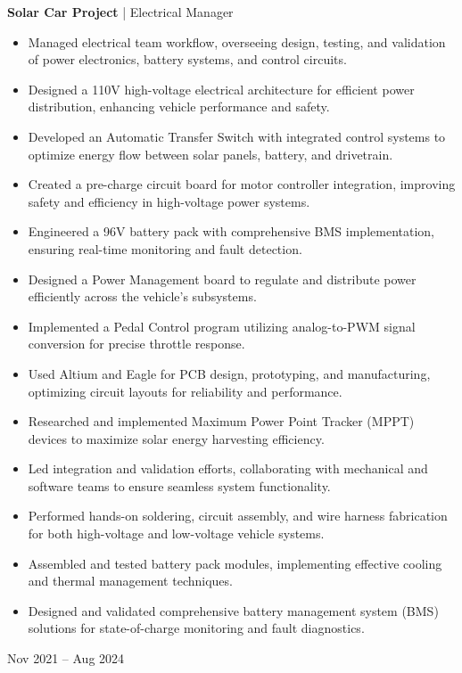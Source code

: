 \documentclass[10pt, letterpaper]{article}
\newenvironment{highlights}{
    \begin{itemize}[
        topsep=0.10 cm,
        parsep=0.10 cm,
        partopsep=0pt,
        itemsep=0pt,
        leftmargin=0.4 cm + 10pt
    ]
}{
    \end{itemize}
} %
\newenvironment{twocolentry}[2][]{
    \onecolentry
    \def\secondColumn{#2}
    \setcolumnwidth{\fill, 4.5 cm}
    \begin{paracol}{2}
}{
    \switchcolumn \raggedleft \secondColumn
    \end{paracol}
    \endonecolentry
} %
\begin{document}
        \begin{twocolentry}{Nov 2021 – Aug 2024}
        \textbf{Solar Car Project} | Electrical Manager
        \begin{highlights}
        \item Managed electrical team workflow, overseeing design, testing, and validation of power electronics, battery systems, and control circuits.
        \item Designed a 110V high-voltage electrical architecture for efficient power distribution, enhancing vehicle performance and safety.
        \item Developed an Automatic Transfer Switch with integrated control systems to optimize energy flow between solar panels, battery, and drivetrain.
        \item Created a pre-charge circuit board for motor controller integration, improving safety and efficiency in high-voltage power systems.
        \item Engineered a 96V battery pack with comprehensive BMS implementation, ensuring real-time monitoring and fault detection.
        \item Designed a Power Management board to regulate and distribute power efficiently across the vehicle’s subsystems.
        \item Implemented a Pedal Control program utilizing analog-to-PWM signal conversion for precise throttle response.
        \item Used Altium and Eagle for PCB design, prototyping, and manufacturing, optimizing circuit layouts for reliability and performance.
        \item Researched and implemented Maximum Power Point Tracker (MPPT) devices to maximize solar energy harvesting efficiency.
        \item Led integration and validation efforts, collaborating with mechanical and software teams to ensure seamless system functionality.
        \item Performed hands-on soldering, circuit assembly, and wire harness fabrication for both high-voltage and low-voltage vehicle systems.
        \item Assembled and tested battery pack modules, implementing effective cooling and thermal management techniques.
        \item Designed and validated comprehensive battery management system (BMS) solutions for state-of-charge monitoring and fault diagnostics.
        \end{highlights}
        \end{twocolentry}
        
\end{document}
